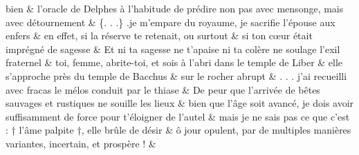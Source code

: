 \documentclass[12pt,onecolumn,twoside,a4paper]{memoir}
\begin{document}
\begin{pairs}
\begin{Rightside}
                              bien \&
                         \stanza 
                      l’oracle de Delphes à l’habitude de prédire non pas avec mensonge,
                              mais avec détournement  \&
                         \stanza 
                      \{. . .\} .je m’empare du royaume, je sacrifie l’épouse aux enfers
                            \&
                         \stanza  en effet, si la réserve te retenait, ou surtout & 
                     si ton cœur était imprégné de sagesse  \&
                         \stanza 
                      Et ni ta sagesse ne t’apaise ni ta colère ne soulage l’exil fraternel
                            \&
                         \stanza 
                      toi, femme, abrite-toi, et sois à l’abri dans le temple de Liber \&
                         \stanza  elle s’approche près du temple de Bacchus & 
                      sur le rocher abrupt  \&
                         \stanza 
                      . . . j’ai recueilli avec fracas le mélos conduit par le thiase  \&
                         \stanza 
                      De peur que l’arrivée de bêtes sauvages et rustiques ne souille les
                              lieux  \&
                         \stanza 
                      bien que l’âge soit avancé, je dois avoir suffisamment de force pour
                              t’éloigner de l’autel  \&
                         \stanza 
                      mais je ne sais pas ce que c’est : † l’âme palpite †, elle brûle de
                              désir  \&
                         \stanza 
                      ô jour opulent, par de multiples manières variantes, incertain, et
                              prospère ! \&
                     
                  \endnumbering
		\end{Rightside}
               \end{pairs}
	\Columns
            
            
\end{document}
